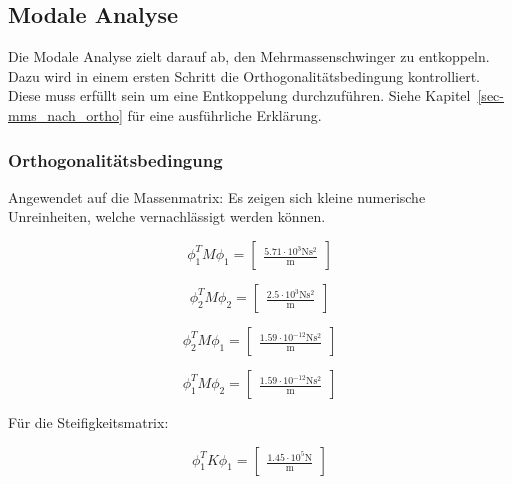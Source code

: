 \documentclass[
  letterpaper,
  DIV=11]{scrreprt}
\begin{document}
\hypertarget{modale-analyse-3}{%
\subsection{Modale Analyse}\label{modale-analyse-3}}

Die Modale Analyse zielt darauf ab, den Mehrmassenschwinger zu
entkoppeln. Dazu wird in einem ersten Schritt die
Orthogonalitätsbedingung kontrolliert. Diese muss erfüllt sein um eine
Entkoppelung durchzuführen. Siehe Kapitel~\ref{sec-mms_nach_ortho} für
eine ausführliche Erklärung.

\hypertarget{orthogonalituxe4tsbedingung-4}{%
\subsubsection{Orthogonalitätsbedingung}\label{orthogonalituxe4tsbedingung-4}}

Angewendet auf die Massenmatrix: Es zeigen sich kleine numerische
Unreinheiten, welche vernachlässigt werden können.

\begin{equation}\phi_{1}^{T} M \phi_{1} = \left[\begin{matrix}\frac{5.71 \cdot 10^{3} \text{N} \text{s}^{2}}{\text{m}}\end{matrix}\right]\end{equation}

\begin{equation}\phi_{2}^{T} M \phi_{2} = \left[\begin{matrix}\frac{2.5 \cdot 10^{3} \text{N} \text{s}^{2}}{\text{m}}\end{matrix}\right]\end{equation}

\begin{equation}\phi_{2}^{T} M \phi_{1} = \left[\begin{matrix}\frac{1.59 \cdot 10^{-12} \text{N} \text{s}^{2}}{\text{m}}\end{matrix}\right]\end{equation}

\begin{equation}\phi_{1}^{T} M \phi_{2} = \left[\begin{matrix}\frac{1.59 \cdot 10^{-12} \text{N} \text{s}^{2}}{\text{m}}\end{matrix}\right]\end{equation}

Für die Steifigkeitsmatrix:

\begin{equation}\phi_{1}^{T} K \phi_{1} = \left[\begin{matrix}\frac{1.45 \cdot 10^{5} \text{N}}{\text{m}}\end{matrix}\right]\end{equation}
\end{document}
